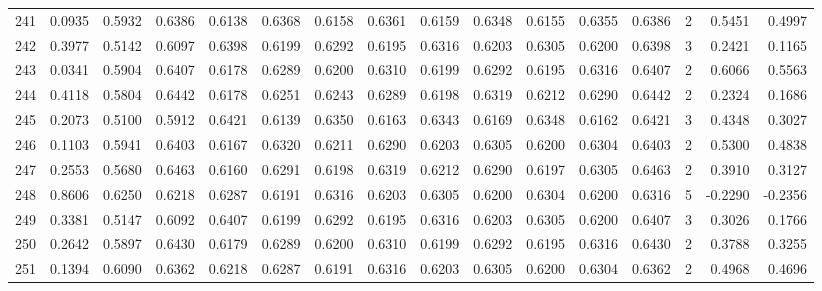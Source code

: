 \begin{tabular}{lrrrrrrrrrrrrrrr}
241 &      0.0935 &  0.5932 &  0.6386 &  0.6138 &  0.6368 &  0.6158 &  0.6361 &  0.6159 &  0.6348 &  0.6155 &   0.6355 &     0.6386 &      2 &                    0.5451 &                     0.4997 \\
242 &      0.3977 &  0.5142 &  0.6097 &  0.6398 &  0.6199 &  0.6292 &  0.6195 &  0.6316 &  0.6203 &  0.6305 &   0.6200 &     0.6398 &      3 &                    0.2421 &                     0.1165 \\
243 &      0.0341 &  0.5904 &  0.6407 &  0.6178 &  0.6289 &  0.6200 &  0.6310 &  0.6199 &  0.6292 &  0.6195 &   0.6316 &     0.6407 &      2 &                    0.6066 &                     0.5563 \\
244 &      0.4118 &  0.5804 &  0.6442 &  0.6178 &  0.6251 &  0.6243 &  0.6289 &  0.6198 &  0.6319 &  0.6212 &   0.6290 &     0.6442 &      2 &                    0.2324 &                     0.1686 \\
245 &      0.2073 &  0.5100 &  0.5912 &  0.6421 &  0.6139 &  0.6350 &  0.6163 &  0.6343 &  0.6169 &  0.6348 &   0.6162 &     0.6421 &      3 &                    0.4348 &                     0.3027 \\
246 &      0.1103 &  0.5941 &  0.6403 &  0.6167 &  0.6320 &  0.6211 &  0.6290 &  0.6203 &  0.6305 &  0.6200 &   0.6304 &     0.6403 &      2 &                    0.5300 &                     0.4838 \\
247 &      0.2553 &  0.5680 &  0.6463 &  0.6160 &  0.6291 &  0.6198 &  0.6319 &  0.6212 &  0.6290 &  0.6197 &   0.6305 &     0.6463 &      2 &                    0.3910 &                     0.3127 \\
248 &      0.8606 &  0.6250 &  0.6218 &  0.6287 &  0.6191 &  0.6316 &  0.6203 &  0.6305 &  0.6200 &  0.6304 &   0.6200 &     0.6316 &      5 &                   -0.2290 &                    -0.2356 \\
249 &      0.3381 &  0.5147 &  0.6092 &  0.6407 &  0.6199 &  0.6292 &  0.6195 &  0.6316 &  0.6203 &  0.6305 &   0.6200 &     0.6407 &      3 &                    0.3026 &                     0.1766 \\
250 &      0.2642 &  0.5897 &  0.6430 &  0.6179 &  0.6289 &  0.6200 &  0.6310 &  0.6199 &  0.6292 &  0.6195 &   0.6316 &     0.6430 &      2 &                    0.3788 &                     0.3255 \\
251 &      0.1394 &  0.6090 &  0.6362 &  0.6218 &  0.6287 &  0.6191 &  0.6316 &  0.6203 &  0.6305 &  0.6200 &   0.6304 &     0.6362 &      2 &                    0.4968 &                     0.4696 \\

\end{tabular}
